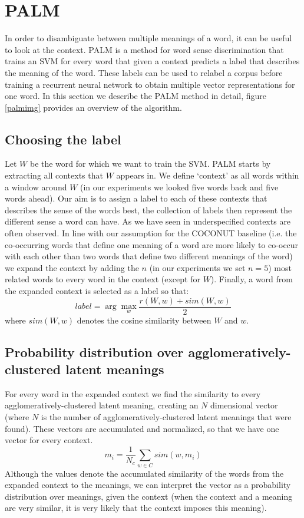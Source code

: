 \documentclass[11pt]{article}
\begin{document}
\section{PALM}
In order to disambiguate between multiple meanings of a word, it can be useful to look at the context. PALM is a method for word sense discrimination that trains an SVM for every word that given a context predicts a label that describes the meaning of the word. These labels can be used to relabel a corpus before training a recurrent neural network to obtain multiple vector representations for one word. In this section we describe the PALM method in detail, figure \ref{palmimg} provides an overview of the algorithm. 

\subsection{Choosing the label}
Let $W$ be the word for which we want to train the SVM. PALM starts by extracting all contexts that $W$ appears in. We define `context' as all words within a window around $W$ (in our experiments we looked five words back and five words ahead). Our aim is to assign a label to each of these contexts that describes the sense of the words best, the collection of labels then represent the different sense a word can have. As we have seen in \cite{analysis} underspecified contexts are often observed. In line with our assumption for the COCONUT baseline (i.e. the co-occurring words that define one meaning of a word are more likely to co-occur with each other than two words that define two different meanings of the word) we expand the context by adding the $n$ (in our experiments we set $n=5$) most related words to every word in the context (except for $W$). Finally, a word from the expanded context is selected as a label so that:
$$label = \arg\max_w \frac{r(W, w) + \textit{sim}(W, w)}{2}$$
where $\textit{sim}(W, w)$ denotes the cosine similarity between $W$ and $w$. 

\subsection{Probability distribution over agglomeratively-clustered latent meanings}
For every word in the expanded context we find the similarity to every agglomeratively-clustered latent meaning, creating an $N$ dimensional vector (where $N$ is the number of agglomeratively-clustered latent meanings that were found). These vectors are accumulated and normalized, so that we have one vector for every context. 
\begin{equation}\label{pa}m_i = \frac{1}{N_c}\sum\limits_{w\in C}sim(w, m_i)\end{equation}
Although the values denote the accumulated similarity of the words from the expanded context to the meanings, we can interpret the vector as a probability distribution over meanings, given the context (when the context and a meaning are very similar, it is very likely that the context imposes this meaning). 
\end{document}
